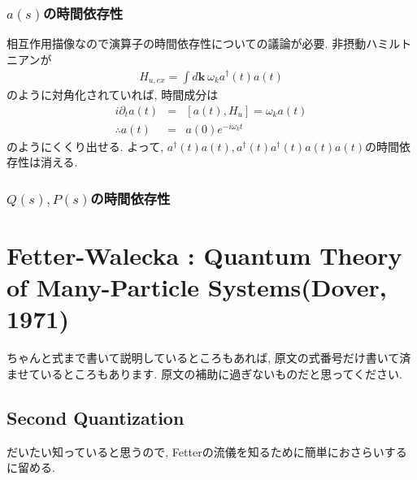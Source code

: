 \documentclass[10.5pt,a4paper]{jreport}
\newcommand{\bk}{\bm{k}}
\begin{document}
\subsection{$a(s)$の時間依存性}
相互作用描像なので演算子の時間依存性についての議論が必要. 非摂動ハミルトニアンが
\begin{eqnarray}
  H_{u, ex} = \int d\bk\ \omega_k a^\dagger(t) a(t)
\end{eqnarray}
のように対角化されていれば, 時間成分は
\begin{eqnarray}
  i\partial_ta(t) &=& [a(t), H_u] = \omega_k a(t)\\
 \therefore a(t) &=& a(0)e^{-i\omega_k t}
\end{eqnarray}
のようにくくり出せる. よって, $a^\dagger(t) a(t), a^\dagger(t) a^\dagger(t) a(t)a(t)$の時間依存性は消える. 
\subsection{$Q(s), P(s)$の時間依存性}
\newpage
\chapter{Fetter-Walecka : Quantum Theory of Many-Particle Systems(Dover, 1971)}
ちゃんと式まで書いて説明しているところもあれば, 原文の式番号だけ書いて済ませているところもあります. 原文の補助に過ぎないものだと思ってください. 
\section{Second Quantization}
だいたい知っていると思うので, Fetterの流儀を知るために簡単におさらいするに留める.
\end{document}
